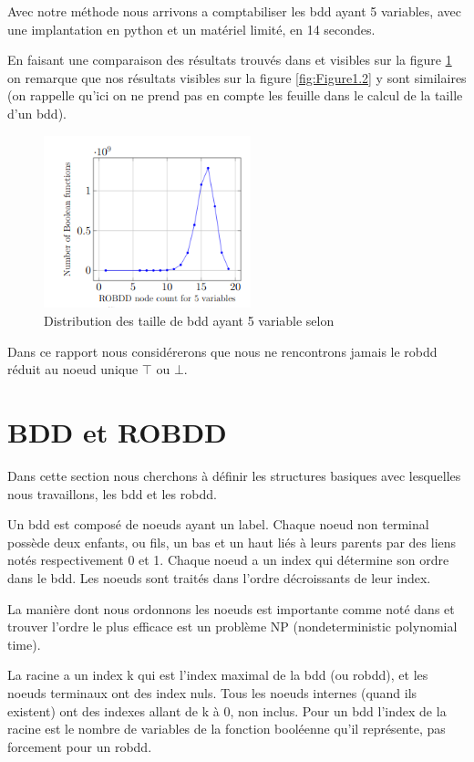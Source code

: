 \documentclass[french]{article}
\begin{document}
Avec notre méthode nous arrivons a comptabiliser les bdd ayant 5 variables, avec une implantation en python et un matériel limité, en 14 secondes.\medskip

En faisant une comparaison des résultats trouvés dans \cite{newton} et visibles sur la figure \ref{fig:Figure1.3} on remarque que nos résultats visibles sur la figure \ref{fig:Figure1.2} y sont similaires (on rappelle qu'ici on ne prend pas en compte les feuille dans le calcul de la taille d'un bdd).\medskip

\begin{figure}[htp]
    \centering
    \includegraphics[width=6cm, height=5cm]{screen de newton.png}
    \caption{Distribution des taille de bdd ayant 5 variable selon \protect\cite{newton}}
    \label{fig:Figure1.3}
\end{figure}

Dans ce rapport nous considérerons que nous ne rencontrons jamais le robdd réduit au noeud unique \(\top\) ou \(\bot.\)
\newpage
\section{BDD et ROBDD}
Dans cette section nous cherchons à définir les structures basiques avec lesquelles nous travaillons, les bdd et les robdd.\medskip

Un bdd est composé de noeuds ayant un label. Chaque noeud non terminal possède deux enfants, ou fils, un bas et un haut liés à leurs parents par des liens notés respectivement 0 et 1. Chaque noeud a un index qui détermine son ordre dans le bdd. Les noeuds sont traités dans l'ordre décroissants de leur index.

La manière dont nous ordonnons les noeuds est importante comme noté dans \cite{newton} et trouver l'ordre le plus efficace est un problème NP (nondeterministic polynomial time).

La racine a un index k qui est l'index maximal de la bdd (ou robdd), et les noeuds terminaux ont des index nuls. Tous les noeuds internes (quand ils existent) ont des indexes allant de k à 0, non inclus. Pour un bdd l'index de la racine est le nombre de variables de la fonction booléenne qu'il représente, pas forcement pour un robdd.\medskip
\end{document}
